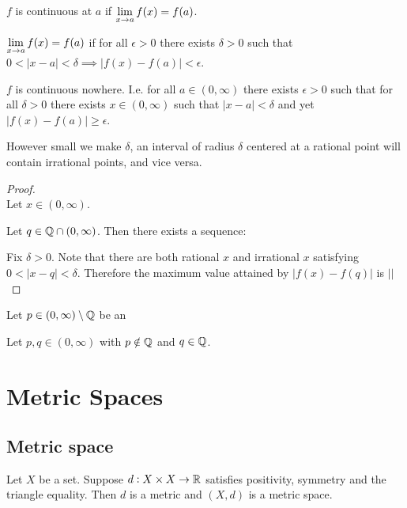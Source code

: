 \begin{definition*}[continuity]
  $f$ is continuous at $a$ if $\LimEq{f(x)}{f(a)}{x}{a}$.
\end{definition*}

\begin{definition*}[limit]
  $\LimEq{f(x)}{f(a)}{x}{a}$ if for all $\epsilon > 0$ there exists $\delta > 0$ such that
  $0 < |x - a| < \delta \implies |f(x) - f(a)| < \epsilon$.
\end{definition*}

\begin{theorem*}
  $f$ is continuous nowhere. I.e. for all $a \in (0, \infty)$ there exists $\epsilon > 0$ such that
  for all $\delta > 0$ there exists $x \in (0, \infty)$ such that $|x - a| < \delta$ and yet
  $|f(x) - f(a)| \geq \epsilon$.
\end{theorem*}

\begin{intuition*}
  However small we make $\delta$, an interval of radius $\delta$ centered at a rational point will
  contain irrational points, and vice versa.
\end{intuition*}

\begin{proof}~\\
  Let $x \in (0, \infty)$.

  Let $q \in \Q \cap (0, \infty)$. Then there exists a sequence:




  Fix $\delta > 0$. Note that there are both rational $x$ and
  irrational $x$ satisfying $0 < |x - q| < \delta$. Therefore the maximum value attained by
  $|f(x) - f(q)|$ is $||$
\end{proof}



Let $p \in (0, \infty) \setminus \Q$ be an

Let $p, q \in (0, \infty)$ with $p \notin \Q$ and $q \in \Q$.


\newpage
\section{Metric Spaces}

\subsection{Metric space}
\begin{definition}
  Let $X$ be a set. Suppose $d:X \times X \to \R$ satisfies positivity, symmetry and the triangle
  equality. Then $d$ is a metric and $(X, d)$ is a metric space.
\end{definition}

